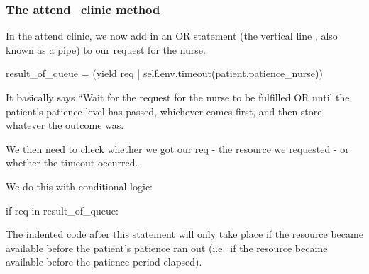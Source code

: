 \documentclass[
  letterpaper,
  DIV=11,
  numbers=noendperiod]{scrreprt}
\newenvironment{Shaded}{}{}
\newcommand{\ControlFlowTok}[1]{\textcolor[rgb]{0.84,0.23,0.29}{#1}}
\newcommand{\KeywordTok}[1]{\textcolor[rgb]{0.84,0.23,0.29}{#1}}
\newcommand{\NormalTok}[1]{\textcolor[rgb]{0.14,0.16,0.18}{#1}}
\newcommand{\OperatorTok}[1]{\textcolor[rgb]{0.14,0.16,0.18}{#1}}
\newcommand{\VariableTok}[1]{\textcolor[rgb]{0.89,0.38,0.04}{#1}}
\begin{document}
\subsubsection{The attend\_clinic
method}\label{the-attend_clinic-method-3}

In the attend clinic, we now add in an OR statement (the vertical line
\textbar{} , also known as a pipe) to our request for the nurse.

\begin{Shaded}
\begin{Highlighting}[]
\NormalTok{result\_of\_queue }\OperatorTok{=}\NormalTok{ (}\ControlFlowTok{yield}\NormalTok{ req }\OperatorTok{|} \VariableTok{self}\NormalTok{.env.timeout(patient.patience\_nurse))}
\end{Highlighting}
\end{Shaded}

It basically says ``Wait for the request for the nurse to be fulfilled
OR until the patient's patience level has passed, whichever comes first,
and then store whatever the outcome was.

We then need to check whether we got our req - the resource we requested
- or whether the timeout occurred.

We do this with conditional logic:

\begin{Shaded}
\begin{Highlighting}[]
\ControlFlowTok{if}\NormalTok{ req }\KeywordTok{in}\NormalTok{ result\_of\_queue:}
\end{Highlighting}
\end{Shaded}

The indented code after this statement will only take place if the
resource became available before the patient's patience ran out (i.e.~if
the resource became available before the patience period elapsed).
\end{document}
